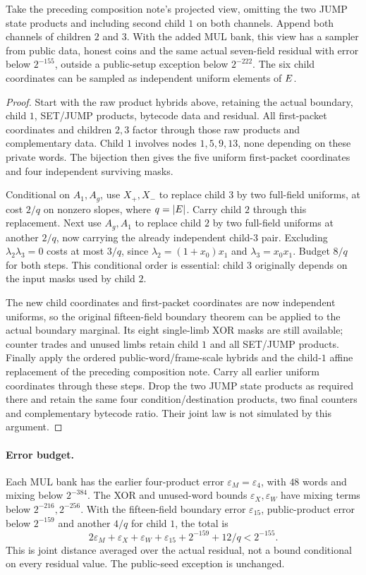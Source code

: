 \begin{proposition}
Take the preceding composition note's projected view, omitting the two JUMP state products and including second child $1$ on both channels. Append both channels of children $2$ and $3$. With the added MUL bank, this view has a sampler from public data, honest coins and the same actual seven-field residual with error below $2^{-155}$, outside a public-setup exception below $2^{-222}$. The six child coordinates can be sampled as independent uniform elements of $E$.
\end{proposition}
\begin{proof}
Start with the raw product hybrids above, retaining the actual boundary, child $1$, SET/JUMP products, bytecode data and residual. All first-packet coordinates and children $2,3$ factor through those raw products and complementary data. Child $1$ involves nodes $1,5,9,13$, none depending on these private words. The bijection then gives the five uniform first-packet coordinates and four independent surviving masks.

Conditional on $A_1,A_g$, use $X_+,X_-$ to replace child $3$ by two full-field uniforms, at cost $2/q$ on nonzero slopes, where $q=|E|$. Carry child $2$ through this replacement. Next use $A_g,A_1$ to replace child $2$ by two full-field uniforms at another $2/q$, now carrying the already independent child-$3$ pair. Excluding $\lambda_2\lambda_3=0$ costs at most $3/q$, since $\lambda_2=(1+x_0)x_1$ and $\lambda_3=x_0x_1$. Budget $8/q$ for both steps. This conditional order is essential: child $3$ originally depends on the input masks used by child $2$.

The new child coordinates and first-packet coordinates are now independent uniforms, so the original fifteen-field boundary theorem can be applied to the actual boundary marginal. Its eight single-limb XOR masks are still available; counter trades and unused limbs retain child $1$ and all SET/JUMP products. Finally apply the ordered public-word/frame-scale hybrids and the child-$1$ affine replacement of the preceding composition note. Carry all earlier uniform coordinates through these steps. Drop the two JUMP state products as required there and retain the same four condition/destination products, two final counters and complementary bytecode ratio. Their joint law is not simulated by this argument.
\end{proof}

\paragraph{Error budget.} Each MUL bank has the earlier four-product error $\varepsilon_M=\varepsilon_4$, with $48$ words and mixing below $2^{-384}$. The XOR and unused-word bounds $\varepsilon_X,\varepsilon_W$ have mixing terms below $2^{-216},2^{-256}$. With the fifteen-field boundary error $\varepsilon_{15}$, public-product error below $2^{-159}$ and another $4/q$ for child $1$, the total is
\[
 2\varepsilon_M+\varepsilon_X+\varepsilon_W+\varepsilon_{15}
       +2^{-159}+12/q<2^{-155}.
\]
This is joint distance averaged over the actual residual, not a bound conditional on every residual value. The public-seed exception is unchanged.


